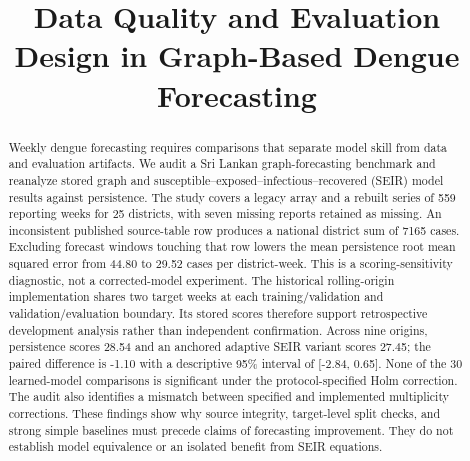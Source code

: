\documentclass[conference]{IEEEtran}
\begin{document}
\title{Data Quality and Evaluation Design in Graph-Based Dengue Forecasting}

\author{
}

\maketitle

\begin{abstract}
Weekly dengue forecasting requires comparisons that separate model skill from data and evaluation artifacts.
We audit a Sri Lankan graph-forecasting benchmark and reanalyze stored graph and susceptible--exposed--infectious--recovered (SEIR) model results against persistence.
The study covers a legacy array and a rebuilt series of 559 reporting weeks for 25 districts, with seven missing reports retained as missing. %
An inconsistent published source-table row produces a national district sum of 7165 cases. %
Excluding forecast windows touching that row lowers the mean persistence root mean squared error from 44.80 to 29.52 cases per district-week. %
This is a scoring-sensitivity diagnostic, not a corrected-model experiment.
The historical rolling-origin implementation shares two target weeks at each training/validation and validation/evaluation boundary. %
Its stored scores therefore support retrospective development analysis rather than independent confirmation.
Across nine origins, persistence scores 28.54 and an anchored adaptive SEIR variant scores 27.45; the paired difference is -1.10 with a descriptive 95\% interval of [-2.84, 0.65]. %
None of the 30 learned-model comparisons is significant under the protocol-specified Holm correction. %
The audit also identifies a mismatch between specified and implemented multiplicity corrections.
These findings show why source integrity, target-level split checks, and strong simple baselines must precede claims of forecasting improvement.
They do not establish model equivalence or an isolated benefit from SEIR equations.
\end{abstract}
\end{document}
